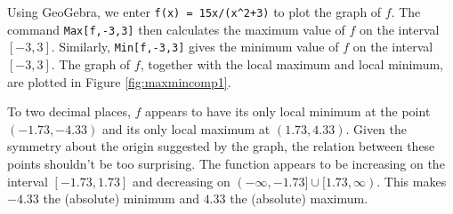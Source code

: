 
\medskip

{
Using GeoGebra, we enter \texttt{f(x) = 15x/(x\string^2+3)} to plot the graph of $f$. The command \texttt{Max[f,-3,3]} then calculates the maximum value of $f$ on the interval $[-3,3]$. Similarly, \texttt{Min[f,-3,3]} gives the minimum value of $f$ on the interval $[-3,3]$. The graph of $f$, together with the local maximum and local minimum, are plotted in Figure \ref{fig:maxmincomp1}.

To two decimal places, $f$ appears to have its only local minimum at the point $(-1.73, -4.33)$ and its only local maximum at  $(1.73, 4.33)$.  Given the symmetry about the origin suggested by the graph, the relation between these points shouldn't be too surprising.  The function appears to be increasing on the interval $[-1.73, 1.73]$ and decreasing on $(-\infty, -1.73] \cup [1.73,\infty)$.  This makes $-4.33$ the (absolute) minimum and $4.33$ the (absolute) maximum. 
}

\pagebreak

